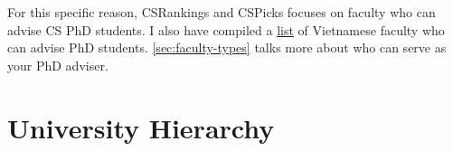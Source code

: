 \documentclass[oneside,11pt]{book}
\begin{document}
For this specific reason,  CSRankings and CSPicks focuses on faculty who can advise CS PhD students. I also have compiled a \href{https://roars.dev/phd-cs-us/viet-cs-profs-us}{list} of Vietnamese faculty who can advise PhD students. \autoref{sec:faculty-types} talks more about who can serve as your PhD adviser.






\section{University Hierarchy}
\end{document}
